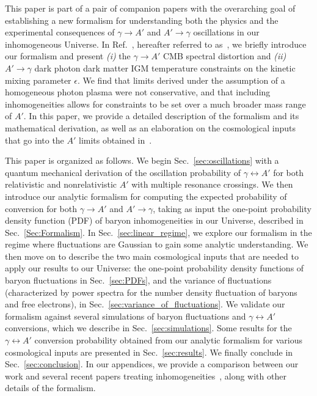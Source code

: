 \documentclass[prd,aps,10pt,nofootinbib,twocolumn,superscriptaddress,preprintnumbers,balancelastpage,longbibliography]{revtex4-1}
\begin{document}
This paper is part of a pair of companion papers with the overarching goal of establishing a new formalism for understanding both the physics and the experimental consequences of $\gamma \to A'$ and $A' \to \gamma$ oscillations in our inhomogeneous Universe. In Ref.~\cite{Caputo:2020bdy}, hereafter referred to as~, we briefly introduce our formalism and present \emph{(i)} the $\gamma \to A'$ CMB spectral distortion and \emph{(ii)}~$A' \to \gamma$ dark photon dark matter IGM temperature constraints on the kinetic mixing parameter $\epsilon$. We find that limits derived under the assumption of a homogeneous photon plasma were not conservative, and that including inhomogeneities allows for constraints to be set over a much broader mass range of $A'$. In this paper, we provide a detailed description of the formalism and its mathematical derivation, as well as an elaboration on the cosmological inputs that go into the $A'$ limits obtained in~. 

This paper is organized as follows. 
We begin Sec.~\ref{sec:oscillations} with a quantum mechanical derivation of the oscillation probability of $\gamma \leftrightarrow A'$ for both relativistic and nonrelativistic $A'$ with multiple resonance crossings. 
We then introduce our analytic formalism for computing the expected probability of conversion for both $\gamma \to A'$ and $A' \to \gamma$, taking as input the one-point probability density function (PDF) of baryon inhomogeneities in our Universe, described in Sec.~\ref{Sec:Formalism}. 
In Sec.~\ref{sec:linear_regime}, we explore our formalism in the regime where fluctuations are Gaussian to gain some analytic understanding. 
We then move on to describe the two main cosmological inputs that are needed to apply our results to our Universe: the one-point probability density functions of baryon fluctuations in Sec.~\ref{sec:PDFs}, and the variance of fluctuations (characterized by power spectra for the number density fluctuation of baryons and free electrons), in Sec.~\ref{sec:variance_of_fluctuations}. 
We validate our formalism against several simulations of baryon fluctuations and $\gamma \leftrightarrow A'$ conversions, which we describe in Sec.~\ref{sec:simulations}. 
Some results for the $\gamma \leftrightarrow A'$ conversion probability obtained from our analytic formalism for various cosmological inputs are presented in Sec.~\ref{sec:results}. 
We finally conclude in Sec.~\ref{sec:conclusion}. 
In our appendices, we provide a comparison between our work and several recent papers treating inhomogeneities~\cite{Bondarenko:2020moh,Garcia:2020qrp,Witte:2020rvb}, along with other details of the formalism.
\end{document}
